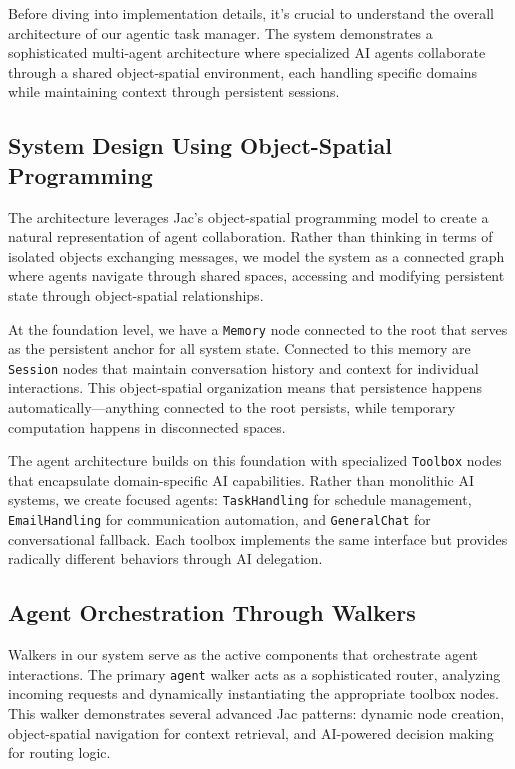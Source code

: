 Before diving into implementation details, it's crucial to understand the overall architecture of our agentic task manager. The system demonstrates a sophisticated multi-agent architecture where specialized AI agents collaborate through a shared object-spatial environment, each handling specific domains while maintaining context through persistent sessions.

\subsection{System Design Using Object-Spatial Programming}

The architecture leverages Jac's object-spatial programming model to create a natural representation of agent collaboration. Rather than thinking in terms of isolated objects exchanging messages, we model the system as a connected graph where agents navigate through shared spaces, accessing and modifying persistent state through object-spatial relationships.

At the foundation level, we have a \texttt{Memory} node connected to the root that serves as the persistent anchor for all system state. Connected to this memory are \texttt{Session} nodes that maintain conversation history and context for individual interactions. This object-spatial organization means that persistence happens automatically—anything connected to the root persists, while temporary computation happens in disconnected spaces.

The agent architecture builds on this foundation with specialized \texttt{Toolbox} nodes that encapsulate domain-specific AI capabilities. Rather than monolithic AI systems, we create focused agents: \texttt{TaskHandling} for schedule management, \texttt{EmailHandling} for communication automation, and \texttt{GeneralChat} for conversational fallback. Each toolbox implements the same interface but provides radically different behaviors through AI delegation.

\subsection{Agent Orchestration Through Walkers}

Walkers in our system serve as the active components that orchestrate agent interactions. The primary \texttt{agent} walker acts as a sophisticated router, analyzing incoming requests and dynamically instantiating the appropriate toolbox nodes. This walker demonstrates several advanced Jac patterns: dynamic node creation, object-spatial navigation for context retrieval, and AI-powered decision making for routing logic.


